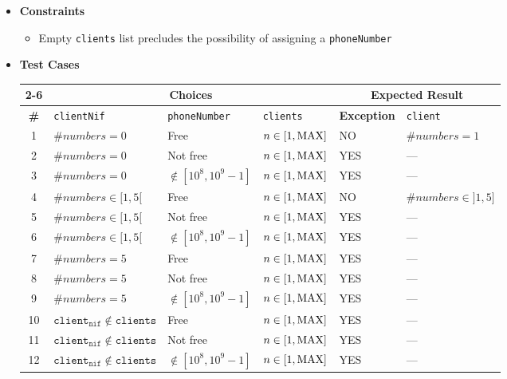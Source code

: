 \begin{itemize}
  \item \textbf{Constraints}
  \begin{itemize}
    \normalsize
    \item Empty \texttt{clients} list precludes the possibility of assigning a
          \texttt{phoneNumber}
  \end{itemize}

  \item \textbf{Test Cases}
  \begin{table}[!hbtp]
    \centering
    \normalsize
    \begin{tabular}{|c|l|l|l|l|l|}
      \cline{2-6}
      \multicolumn{1}{}{}
        & \multicolumn{3}{|c}{\textbf{Choices}}
        & \multicolumn{2}{|c|}{\textbf{Expected Result}} \\
      \hline
      \textbf{\#}
        & \texttt{clientNif} & \texttt{phoneNumber} & \texttt{clients}
        & \textbf{Exception} & \texttt{client} \\
      \hline
       1 & $\#numbers = 0$ & Free & $n \in [1,\rm{MAX}]$
         & NO & $\#numbers = 1$ \\ \hline
       2 & $\#numbers = 0$ & Not free & $n \in [1,\rm{MAX}]$
         & YES & --- \\ \hline
       3 & $\#numbers = 0$ & $\notin [10^8,10^9-1]$ & $n \in [1,\rm{MAX}]$
         & YES & --- \\ \hline

       4 & $\#numbers \in [1,5[$ & Free & $n \in [1,\rm{MAX}]$
         & NO & $\#numbers \in ]1,5]$ \\ \hline
       5 & $\#numbers \in [1,5[$ & Not free & $n \in [1,\rm{MAX}]$
         & YES & --- \\ \hline
       6 & $\#numbers \in [1,5[$ & $\notin [10^8,10^9-1]$ & $n \in [1,\rm{MAX}]$
         & YES & --- \\ \hline

       7 & $\#numbers = 5$ & Free & $n \in [1,\rm{MAX}]$
         & YES & --- \\ \hline
       8 & $\#numbers = 5$ & Not free & $n \in [1,\rm{MAX}]$
         & YES & --- \\ \hline
       9 & $\#numbers = 5$ & $\notin [10^8,10^9-1]$ & $n \in [1,\rm{MAX}]$
         & YES & --- \\ \hline


      10 & $\texttt{client}_{\texttt{nif}} \notin \texttt{clients}$
           & Free & $n \in [1,\rm{MAX}]$
         & YES & --- \\ \hline
      11 & $\texttt{client}_{\texttt{nif}} \notin \texttt{clients}$
           & Not free & $n \in [1,\rm{MAX}]$
         & YES & --- \\ \hline
      12 & $\texttt{client}_{\texttt{nif}} \notin \texttt{clients}$
           & $\notin [10^8,10^9-1]$ & $n \in [1,\rm{MAX}]$
         & YES & --- \\ \hline



\end{tabular}
\end{table}
\end{itemize}
